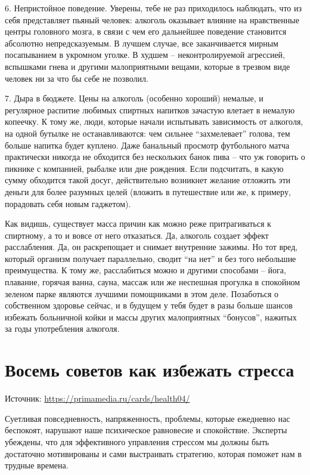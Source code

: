 6. Непристойное поведение. Уверены, тебе не раз приходилось наблюдать, что из себя представляет пьяный человек: алкоголь оказывает влияние на нравственные центры головного мозга, в связи с чем его дальнейшее поведение становится абсолютно непредсказуемым. В лучшем случае, все заканчивается мирным посапыванием в укромном уголке. В худшем – неконтролируемой агрессией, вспышками гнева и другими малоприятными вещами, которые в трезвом виде человек ни за что бы себе не позволил.

7. Дыра в бюджете. Цены на алкоголь (особенно хороший) немалые, и регулярное распитие любимых спиртных напитков зачастую влетает в немалую копеечку. К тому же, люди, которые начали испытывать зависимость от алкоголя, на одной бутылке не останавливаются: чем сильнее “захмелевает” голова, тем больше напитка будет куплено. Даже банальный просмотр футбольного матча практически никогда не обходится без нескольких банок пива – что уж говорить о пикнике с компанией, рыбалке или дне рождения. Если подсчитать, в какую сумму обходится такой досуг, действительно возникнет желание отложить эти деньги для более разумных целей (вложить в путешествие или же, к примеру, порадовать себя новым гаджетом).

Как видишь, существует масса причин как можно реже притрагиваться к спиртному, а то и вовсе от него отказаться. Да, алкоголь создает эффект расслабления. Да, он раскрепощает и снимает внутренние зажимы. Но тот вред, который организм получает параллельно, сводит “на нет” и без того небольшие преимущества. К тому же, расслабиться можно и другими способами – йога, плавание, горячая ванна, сауна, массаж или же неспешная прогулка в спокойном зеленом парке являются лучшими помощниками в этом деле. Позаботься о собственном здоровье сейчас, и в будущем у тебя будет в разы больше шансов избежать больничной койки и массы других малоприятных “бонусов”, нажитых за годы употребления алкоголя.

\section{Восемь советов как избежать стресса}
Источник: \url{https://primamedia.ru/cards/health04/}

Суетливая повседневность, напряженность, проблемы, которые ежедневно нас беспокоят, нарушают наше психическое равновесие и спокойствие. Эксперты убеждены, что для эффективного управления стрессом мы должны быть достаточно мотивированы и сами выстраивать стратегию, которая поможет нам в трудные времена.

